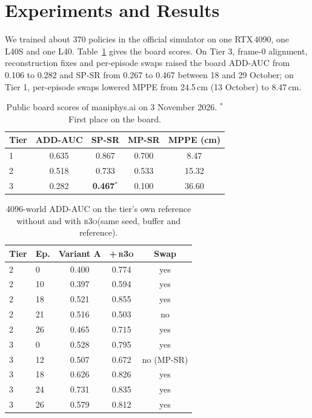 \documentclass[10pt]{nvidiaextabstract}
\newcommand{\rtho}{\textsc{r3o}\xspace}
\begin{document}
\section{Experiments and Results}
\label{sec:experiments}

We trained about 370 policies in the official simulator on one RTX\,4090, one L40S and one L40.
Table~\ref{tab:board} gives the board scores. On Tier 3, frame-0 alignment, reconstruction fixes and per-episode swaps raised the board ADD-AUC from 0.106 to 0.282 and SP-SR from 0.267 to 0.467 between 18 and 29 October; on Tier 1, per-episode swaps lowered MPPE from 24.5\,cm (13 October) to 8.47\,cm.

\begin{table}[t]
  \centering
  \small
  \begin{tabular}{lcccc}
    \toprule
    Tier & ADD-AUC & SP-SR & MP-SR & MPPE (cm) \\
    \midrule
    1 & 0.635 & 0.867 & 0.700 & 8.47 \\
    2 & 0.518 & 0.733 & 0.533 & 15.32 \\
    3 & 0.282 & \textbf{0.467}$^{\ast}$ & 0.100 & 36.60 \\
    \bottomrule
  \end{tabular}
  \caption{Public board scores of maniphys.ai on 3 November 2026. $^{\ast}$First place on the board.}
  \label{tab:board}
\end{table}

\begin{table}[t]
  \centering
  \small
  \begin{tabular}{llccc}
    \toprule
    Tier & Ep. & Variant A & +\,\rtho & Swap \\
    \midrule
    2 & 0  & 0.400 & 0.774 & yes \\
    2 & 10 & 0.397 & 0.594 & yes \\
    2 & 18 & 0.521 & 0.855 & yes \\
    2 & 21 & 0.516 & 0.503 & no \\
    2 & 26 & 0.465 & 0.715 & yes \\
    3 & 0  & 0.528 & 0.795 & yes \\
    3 & 12 & 0.507 & 0.672 & no (MP-SR) \\
    3 & 18 & 0.626 & 0.826 & yes \\
    3 & 24 & 0.731 & 0.835 & yes \\
    3 & 26 & 0.579 & 0.812 & yes \\
    \bottomrule
  \end{tabular}
  \caption{4096-world ADD-AUC on the tier's own reference without and with \rtho (same seed, buffer and reference).}
  \label{tab:r3o}
\end{table}
\end{document}
